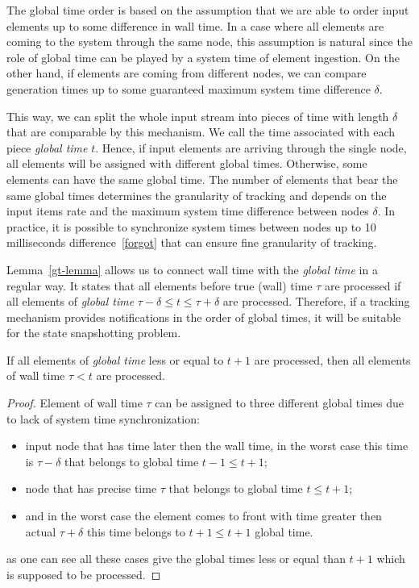 The global time order is based on the assumption that we are able to order input elements up to some difference in wall time. In a case where all elements are coming to the system through the same node, this assumption is natural since the role of global time can be played by a system time of element ingestion. On the other hand, if elements are coming from different nodes, we can compare generation times up to some guaranteed maximum system time difference $\delta$. 

This way, we can split the whole input stream into pieces of time with length $\delta$ that are comparable by this mechanism. We call the time associated with each piece \textit{global time} $t$. Hence, if input elements are arriving through the single node, all elements will be assigned with different global times. Otherwise, some elements can have the same global time. The number of elements that bear the same global times determines the granularity of tracking and depends on the input items rate and the maximum system time difference between nodes $\delta$. In practice, it is possible to synchronize system times between nodes up to 10 milliseconds difference~\ref{forgot} that can ensure fine granularity of tracking.

Lemma~\ref{gt-lemma} allows us to connect wall time with the \textit{global time} in a regular way. It states that all elements before true (wall) time $\tau$ are processed if all elements of \textit{global time} $\tau - \delta \le t \le \tau + \delta$ are processed. Therefore, if a tracking mechanism provides notifications in the order of global times, it will be suitable for the state snapshotting problem.

\begin{lemma}
\label{gt-lemma}
If all elements of \textit{global time} less or equal to $t + 1$ are processed, then all elements of wall time $\tau < t$ are processed.
\end{lemma}
\begin{proof}
Element of wall time $\tau$ can be assigned to three different global times due to lack of system time synchronization:
\begin{itemize}
    \item input node that has time later then the wall time, in the worst case this time is $\tau - \delta$ that belongs to global time $t - 1 \le t + 1$;
    \item node that has precise time $\tau$ that belongs to global time $t \le t + 1$;
    \item and in the worst case the element comes to front with time greater then actual $\tau + \delta$ this time belongs to $t + 1 \le t + 1$ global time.
\end{itemize}
as one can see all these cases give the global times less or equal than $t + 1$ which is supposed to be processed.
\end{proof}

